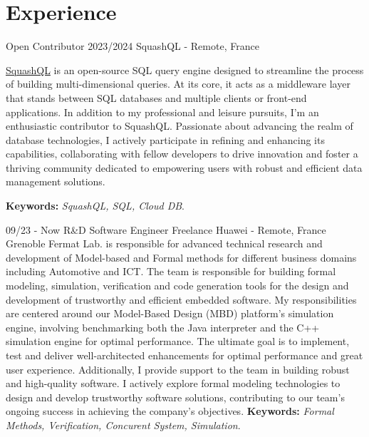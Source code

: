 \documentclass[]{friggeri-cv}
\begin{document}
\section{Experience}
\begin{entrylist}
   \entry
    {Open Contributor}
    {2023/2024}
    {SquashQL - Remote, France}
    {\href{https://www.squashql.io/}{SquashQL} is an open-source SQL query engine designed
     to streamline the process of building multi-dimensional queries. At its core, it acts as a middleware
     layer that stands between SQL databases and multiple clients or front-end applications. \newline
     In addition to my professional and leisure pursuits, I'm an enthusiastic contributor to SquashQL.
     Passionate about advancing the realm of database technologies, I actively participate in refining
     and enhancing its capabilities, collaborating with fellow developers to drive innovation and foster a
     thriving community dedicated to empowering users with robust and efficient data management solutions.

     \textbf{Keywords:} \emph{SquashQL, SQL, Cloud DB}.
    }

   \entry
    {09/23 - Now}
    {R\&D Software Engineer Freelance}
    {Huawei - Remote, France}
    {Grenoble Fermat Lab. is responsible for advanced technical research and development of Model-based
     and Formal methods for different business domains including Automotive and ICT. The team is responsible
     for building formal modeling, simulation, verification and code generation tools for the design
     and development of trustworthy and efficient embedded software. 
     \newline
     My responsibilities are centered around our Model-Based Design (MBD) platform's simulation engine,
     involving benchmarking both the Java interpreter and the C++ simulation engine for optimal performance.
     The ultimate goal is to implement, test and deliver well-architected enhancements for optimal performance
     and great user experience. Additionally, I provide support to the team in building robust and high-quality
     software. I actively explore formal modeling technologies to design and develop trustworthy software
     solutions, contributing to our team's ongoing success in achieving the company's objectives.
     \textbf{Keywords:} \emph{Formal Methods, Verification, Concurent System, Simulation}.
    }


\end{entrylist}
\end{document}
